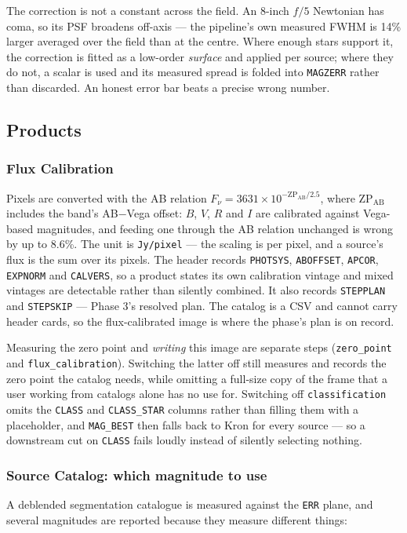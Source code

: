 \documentclass[11pt,a4paper]{article}
\begin{document}
The correction is not a constant across the field. An 8-inch $f/5$ Newtonian has
coma, so its PSF broadens off-axis --- the pipeline's own measured FWHM is 14\%
larger averaged over the field than at the centre. Where enough stars support
it, the correction is fitted as a low-order \emph{surface} and applied per
source; where they do not, a scalar is used and its measured spread is folded
into \texttt{MAGZERR} rather than discarded. An honest error bar beats a precise
wrong number.

\subsection{Products}
\subsubsection{Flux Calibration}
Pixels are converted with the AB relation
$F_\nu = 3631 \times 10^{-\mathrm{ZP}_{\mathrm{AB}}/2.5}$, where
$\mathrm{ZP}_{\mathrm{AB}}$ includes the band's AB$-$Vega offset: $B$, $V$, $R$
and $I$ are calibrated against Vega-based magnitudes, and feeding one through the
AB relation unchanged is wrong by up to 8.6\%. The unit is \texttt{Jy/pixel} ---
the scaling is per pixel, and a source's flux is the sum over its pixels. The
header records \texttt{PHOTSYS}, \texttt{ABOFFSET}, \texttt{APCOR},
\texttt{EXPNORM} and \texttt{CALVERS}, so a product states its own calibration
vintage and mixed vintages are detectable rather than silently combined. It also
records \texttt{STEPPLAN} and \texttt{STEPSKIP} --- Phase 3's resolved plan. The
catalog is a CSV and cannot carry header cards, so the flux-calibrated image is
where the phase's plan is on record.

\begin{sloppypar}
Measuring the zero point and \emph{writing} this image are separate steps
(\texttt{zero\_point} and \texttt{flux\_calibration}). Switching the latter off
still measures and records the zero point the catalog needs, while omitting a
full-size copy of the frame that a user working from catalogs alone has no use
for. Switching off \texttt{classification} omits the \texttt{CLASS} and
\texttt{CLASS\_STAR} columns rather than filling them with a placeholder, and
\texttt{MAG\_BEST} then falls back to Kron for every source --- so a downstream
cut on \texttt{CLASS} fails loudly instead of silently selecting nothing.
\end{sloppypar}

\subsubsection{Source Catalog: which magnitude to use}
A deblended segmentation catalogue is measured against the \texttt{ERR} plane,
and several magnitudes are reported because they measure different things:
\end{document}
